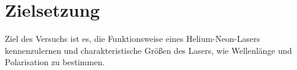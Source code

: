 \section{Zielsetzung}
\label{sec:zielsetzung}

Ziel des Versuchs ist es, die Funktionsweise eines Helium-Neon-Lasers
kennenzulernen und charakteristische Größen des Lasers, wie Wellenlänge und
Polarisation zu bestimmen.
